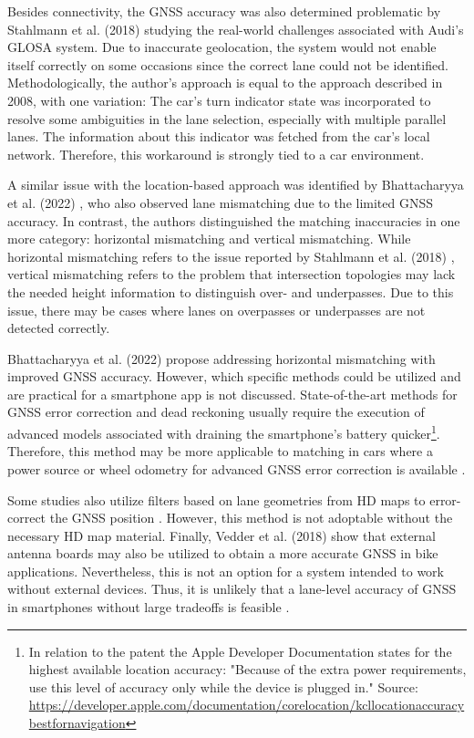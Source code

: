 Besides connectivity, the GNSS accuracy was also determined problematic by Stahlmann et al. (2018) \cite{stahlmann_exploring_2018} studying the real-world challenges associated with Audi's GLOSA system. Due to inaccurate geolocation, the system would not enable itself correctly on some occasions since the correct lane could not be identified. Methodologically, the author's approach is equal to the approach described in 2008, with one variation: The car's turn indicator state was incorporated to resolve some ambiguities in the lane selection, especially with multiple parallel lanes. The information about this indicator was fetched from the car's local network. Therefore, this workaround is strongly tied to a car environment.

A similar issue with the location-based approach was identified by Bhattacharyya et al. (2022) \cite{bhattacharyya_assessing_2022}, who also observed lane mismatching due to the limited GNSS accuracy. In contrast, the authors distinguished the matching inaccuracies in one more category: horizontal mismatching and vertical mismatching. While horizontal mismatching refers to the issue reported by Stahlmann et al. (2018) \cite{stahlmann_exploring_2018}, vertical mismatching refers to the problem that intersection topologies may lack the needed height information to distinguish over- and underpasses. Due to this issue, there may be cases where lanes on overpasses or underpasses are not detected correctly.

Bhattacharyya et al. (2022) \cite{bhattacharyya_assessing_2022} propose addressing horizontal mismatching with improved GNSS accuracy. However, which specific methods could be utilized and are practical for a smartphone app is not discussed. State-of-the-art methods for GNSS error correction and dead reckoning usually require the execution of advanced models \cite{werner_machine_2020} associated with draining the smartphone's battery quicker\footnote{In relation to the patent \cite{werner_machine_2020} the Apple Developer Documentation states for the highest available location accuracy: "Because of the extra power requirements, use this level of accuracy only while the device is plugged in." Source: \url{https://developer.apple.com/documentation/corelocation/kcllocationaccuracybestfornavigation}}. Therefore, this method may be more applicable to matching in cars where a power source or wheel odometry for advanced GNSS error correction is available \cite{merriaux_wheel_2014}. 

Some studies also utilize filters based on lane geometries from HD maps to error-correct the GNSS position \cite{toledo-moreo_lane-level_2010, li_lane-level_2017}. However, this method is not adoptable without the necessary HD map material. Finally, Vedder et al. (2018) \cite{vedder_accurate_2018} show that external antenna boards may also be utilized to obtain a more accurate GNSS in bike applications. Nevertheless, this is not an option for a system intended to work without external devices. Thus, it is unlikely that a lane-level accuracy of GNSS in smartphones without large tradeoffs is feasible \cite{lindsey_feasibility_2013}.

